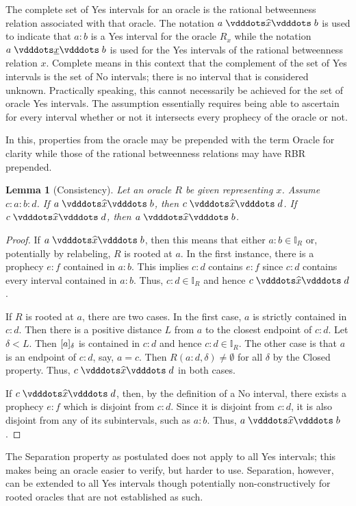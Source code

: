 \documentclass[12pt]{article}
\newtheorem{lemma}{Lemma}[section]
\begin{document}
The complete set of Yes intervals for an oracle is the rational betweenness relation associated with that oracle. The notation $a \xora b$ is used to indicate that $a:b$ is a Yes interval for the oracle $R_x$ while the notation $a \xrel b$ is used for the Yes intervals of the rational betweenness relation $x$. Complete means in this context that the complement of the set of Yes intervals is the set of No intervals; there is no interval that is considered unknown. Practically speaking, this cannot necessarily be achieved for the set of oracle Yes intervals. The assumption essentially requires being able to ascertain for every interval whether or not it intersects every prophecy of the oracle or not. 

In this, properties from the oracle may be prepended with the term Oracle for clarity while those of the rational betweenness relations may have RBR prepended. 

\begin{lemma}[Consistency]\label{os:con}
    Let an oracle $R$ be given representing $x$. Assume $c:a:b:d$. If $a \xora b$, then $c \xora d$. If \sout{$c \xora d$}, then \sout{$a \xora b$}. 
\end{lemma}

\begin{proof}
    If $a \xora b$, then this means that either $a:b \in \mathbb{I}_R$ or, potentially by relabeling, $R$ is rooted at $a$. In the first instance, there is a prophecy $e:f$ contained in $a:b$. This implies $c:d$ contains $e:f$ since $c:d$ contains every interval contained in $a:b$. Thus, $c:d \in \mathbb{I}_R$ and hence $c \xora d$. 
    
    If $R$ is rooted at $a$, there are two cases. In the first case, $a$ is strictly contained in $c:d$. Then there is a positive distance $L$ from $a$ to the closest endpoint of $c:d$. Let $\delta < L$. Then $[a]_{\delta}$ is contained in $c:d$ and hence $c:d \in \mathbb{I}_R$. The other case is that $a$ is an endpoint of $c:d$, say, $ a= c$. Then $R(a:d, \delta) \neq \emptyset$ for all $\delta$ by the Closed property. Thus, $c \xora d$ in both cases.  

    If \sout{$c \xora d$}, then, by the definition of a No interval, there exists a prophecy $e:f$ which is disjoint from $c:d$. Since it is disjoint from $c:d$, it is also disjoint from any of its subintervals, such as $a:b$. Thus, \sout{$a \xora b$}.    
\end{proof}

The Separation property as postulated does not apply to all Yes intervals; this makes being an oracle easier to verify, but harder to use. Separation, however, can be extended to all Yes intervals though potentially non-constructively for rooted oracles that are not established as such.
\end{document}
